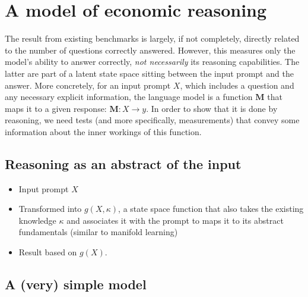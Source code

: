 \documentclass[
]{article}
\begin{document}
\hypertarget{a-model-of-economic-reasoning}{%
\section{A model of economic
reasoning}\label{a-model-of-economic-reasoning}}

The result from existing benchmarks is largely, if not completely,
directly related to the number of questions correctly answered. However,
this measures only the model's ability to answer correctly, \emph{not
necessarily} its reasoning capabilities. The latter are part of a latent
state space sitting between the input prompt and the answer. More
concretely, for an input prompt \(X\), which includes a question and any
necessary explicit information, the language model is a function
\(\mathbf{M}\) that maps it to a given response:
\(\mathbf{M} : X \to y\). In order to show that it is done by reasoning,
we need tests (and more specifically, measurements) that convey some
information about the inner workings of this function.

\hypertarget{reasoning-as-an-abstract-of-the-input}{%
\subsection{Reasoning as an abstract of the
input}\label{reasoning-as-an-abstract-of-the-input}}

\begin{itemize}
\item
  Input prompt \(X\)
\item
  Transformed into \(g(X, \kappa)\), a state space function that also
  takes the existing knowledge \(\kappa\) and associates it with the
  prompt to maps it to its abstract fundamentals (similar to manifold
  learning)
\item
  Result based on \(g(X)\).
\end{itemize}

\hypertarget{a-very-simple-model}{%
\subsection{A (very) simple model}\label{a-very-simple-model}}
\end{document}
